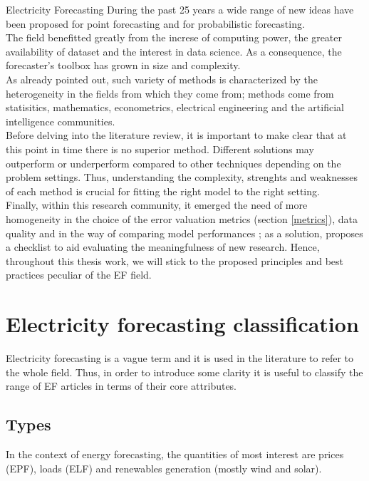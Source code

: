 Electricity Forecasting 
During the past 25 years %
a wide range of new ideas have been proposed for point forecasting and for probabilistic forecasting.
\\
The field benefitted greatly from the increse of computing power, the greater availability of dataset and the interest in data science.
As a consequence, the forecaster's toolbox has grown in size and complexity.
\\
As already pointed out, such variety of methods is characterized by the heterogeneity in the fields from which they come from; methods come from statisitics, mathematics, econometrics, electrical engineering and the artificial intelligence communities.
\\
Before delving into the literature review, it is important to make clear that at this point in time there is no superior method. Different solutions may outperform or underperform compared to other techniques depending on the problem settings. Thus, understanding the complexity, strenghts and weaknesses of each method is crucial for fitting the right model to the right setting.
\\
Finally, within this research community, it emerged the need of more homogeneity in the choice of the error valuation metrics (section \ref{metrics}), data quality and in the way of comparing model performances \cite{EPF_review}; as a solution, \cite{review_2021} proposes a checklist to aid evaluating the meaningfulness of new research. Hence, throughout this thesis work, we will stick to the proposed principles and best practices peculiar of the EF field.

\section{Electricity forecasting classification}
Electricity forecasting is a vague term and it is used in the literature to refer to the whole field. Thus, in order to introduce some clarity it is useful to classify the range of EF articles in terms of their core attributes.
\subsection{Types}
In the context of energy forecasting, the quantities of most interest are prices (EPF), loads (ELF) and renewables generation (mostly wind and solar).

